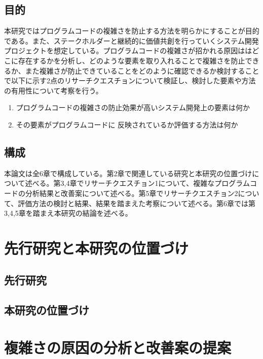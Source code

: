 \documentclass[12pt, a4paper]{jreport}
\begin{document}
\section{目的}
本研究ではプログラムコードの複雑さを防止する方法を明らかにすることが目的である。また、ステークホルダーと継続的に価値共創を行っていくシステム開発プロジェクトを想定している。プログラムコードの複雑さが招かれる原因ははどこに存在するかを分析し、どのような要素を取り入れることで複雑さを防止できるか、また複雑さが防止できていることをどのように確認できるか検討することで以下に示す2点のリサーチクエスチョンについて検証し、検討した要素や方法の有用性について考察を行う。
\begin{enumerate}
\item プログラムコードの複雑さの防止効果が高いシステム開発上の要素は何か
\item その要素がプログラムコードに
反映されているか評価する方法は何か
\end{enumerate}
\section{構成}
本論文は全6章で構成している。第2章で関連している研究と本研究の位置づけについて述べる。第3,4章でリサーチクエスチョン1について、複雑なプログラムコードの分析結果と改善案について述べる。第5章でリサーチクエスチョン2について、評価方法の検討と結果、結果を踏まえた考察について述べる。第6章では第3,4,5章を踏まえ本研究の結論を述べる。
\chapter{先行研究と本研究の位置づけ}
\section{先行研究}
\subsection{}
\subsection{}
\section{本研究の位置づけ}
\chapter{複雑さの原因の分析と改善案の提案}
\end{document}
